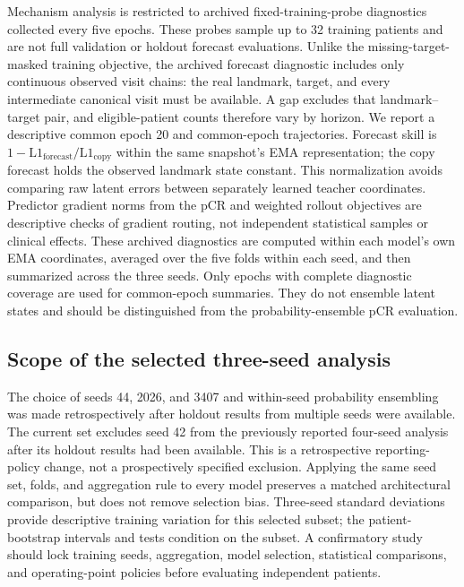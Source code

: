 Mechanism analysis is restricted to archived fixed-training-probe diagnostics collected every five epochs. These probes sample up to 32 training patients and are not full validation or holdout forecast evaluations. Unlike the missing-target-masked training objective, the archived forecast diagnostic includes only continuous observed visit chains: the real landmark, target, and every intermediate canonical visit must be available. A gap excludes that landmark--target pair, and eligible-patient counts therefore vary by horizon. We report a descriptive common epoch 20 and common-epoch trajectories. Forecast skill is $1-\mathrm{L1}_{\mathrm{forecast}}/\mathrm{L1}_{\mathrm{copy}}$ within the same snapshot's EMA representation; the copy forecast holds the observed landmark state constant. This normalization avoids comparing raw latent errors between separately learned teacher coordinates. Predictor gradient norms from the pCR and weighted rollout objectives are descriptive checks of gradient routing, not independent statistical samples or clinical effects. These archived diagnostics are computed within each model's own EMA coordinates, averaged over the five folds within each seed, and then summarized across the three seeds. Only epochs with complete diagnostic coverage are used for common-epoch summaries. They do not ensemble latent states and should be distinguished from the probability-ensemble pCR evaluation.

\subsection{Scope of the selected three-seed analysis}
The choice of seeds 44, 2026, and 3407 and within-seed probability ensembling was made retrospectively after holdout results from multiple seeds were available. The current set excludes seed 42 from the previously reported four-seed analysis after its holdout results had been available. This is a retrospective reporting-policy change, not a prospectively specified exclusion. Applying the same seed set, folds, and aggregation rule to every model preserves a matched architectural comparison, but does not remove selection bias. Three-seed standard deviations provide descriptive training variation for this selected subset; the patient-bootstrap intervals and tests condition on the subset. A confirmatory study should lock training seeds, aggregation, model selection, statistical comparisons, and operating-point policies before evaluating independent patients.
